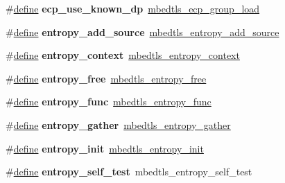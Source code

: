 \begin{DoxyCompactItemize}
\#\hyperlink{structdefine}{define} {\bfseries ecp\+\_\+use\+\_\+known\+\_\+dp}~\hyperlink{ecp_8h_aa0fa8e161975dc31f819b5859016863e}{mbedtls\+\_\+ecp\+\_\+group\+\_\+load}
\item 
\mbox{\label{compat-1_83_8h_a7b560445b0d88de4da5458c97d657d3e}} 
\#\hyperlink{structdefine}{define} {\bfseries entropy\+\_\+add\+\_\+source}~\hyperlink{entropy_8h_ad1bf424d076142e9aeec9e68207f5aaa}{mbedtls\+\_\+entropy\+\_\+add\+\_\+source}
\item 
\mbox{\label{compat-1_83_8h_a1660b9eef831ffa41b3df419a819f953}} 
\#\hyperlink{structdefine}{define} {\bfseries entropy\+\_\+context}~\hyperlink{structmbedtls__entropy__context}{mbedtls\+\_\+entropy\+\_\+context}
\item 
\mbox{\label{compat-1_83_8h_acd19ba9b94f7bcac39265496d10794a2}} 
\#\hyperlink{structdefine}{define} {\bfseries entropy\+\_\+free}~\hyperlink{entropy_8h_a06778439f8a0e2daa2d3b444e06ad8dd}{mbedtls\+\_\+entropy\+\_\+free}
\item 
\mbox{\label{compat-1_83_8h_ade3c1917995519ddf981bf705361e411}} 
\#\hyperlink{structdefine}{define} {\bfseries entropy\+\_\+func}~\hyperlink{entropy_8h_a81765f6cdf4e5111bcb9f4324f3234cb}{mbedtls\+\_\+entropy\+\_\+func}
\item 
\mbox{\label{compat-1_83_8h_a8810be69f902c469054611f347924a74}} 
\#\hyperlink{structdefine}{define} {\bfseries entropy\+\_\+gather}~\hyperlink{entropy_8h_ac49de4b842e7d56cfcd1088286a09b7d}{mbedtls\+\_\+entropy\+\_\+gather}
\item 
\mbox{\label{compat-1_83_8h_a9736e23bf2d115f717719712e7d2bb2c}} 
\#\hyperlink{structdefine}{define} {\bfseries entropy\+\_\+init}~\hyperlink{entropy_8h_aa901e027093c6fe65dee5760db78aced}{mbedtls\+\_\+entropy\+\_\+init}
\item 
\mbox{\label{compat-1_83_8h_aadd737d73435e92b38f3fa125a09c2eb}} 
\#\hyperlink{structdefine}{define} {\bfseries entropy\+\_\+self\+\_\+test}~mbedtls\+\_\+entropy\+\_\+self\+\_\+test
\item 
\mbox{\label{compat-1_83_8h_a6604b004880cd270e0b4a2c6411e3080}} 

\end{DoxyCompactItemize}
